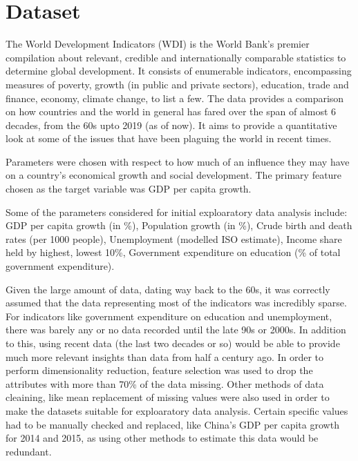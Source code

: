 \documentclass[conference]{IEEEtran}
\begin{document}
\section{Dataset}
The World Development Indicators (WDI) is the World Bank’s premier compilation 
about relevant, credible and internationally comparable statistics to determine 
global development. It consists of enumerable indicators, encompassing measures 
of poverty, growth (in public and private sectors), education, trade and finance, 
economy, climate change, to list a few. The data provides a comparison on how 
countries and the world in general has fared over the span of almost 6 decades, 
from the 60s upto 2019 (as of now). It aims to provide a quantitative look at 
some of the issues that have been plaguing the world in recent times.

Parameters were chosen with respect to how much of an influence they may have 
on a country's economical growth and social development. The primary feature chosen
as the target variable was GDP per capita growth.

Some of the parameters considered for initial exploaratory data analysis include: 
GDP per capita growth (in \%), 
Population growth (in \%), 
Crude birth and death rates (per 1000 people), 
Unemployment (modelled ISO estimate), 
Income share held by highest, lowest 10\%, 
Government expenditure on education (\% of total government expenditure).


Given the large amount of data, dating way back to the 60s, it was correctly assumed that the data representing most of the indicators was incredibly sparse. For indicators like government expenditure on education and unemployment, there was barely any or no data recorded until the late 90s or 2000s. In addition to this, using recent data (the last two decades or so) would be able to provide much more relevant insights than data from half a century ago. In order to perform dimensionality reduction, feature selection was used to drop the attributes with more than 
70\% of the data missing. Other methods of data cleaining, like mean replacement of missing values were also used in order to make the datasets suitable for exploaratory data analysis. Certain specific values had to be manually checked and replaced, like China's GDP per capita growth for 2014 and 2015, as using other methods to estimate this data would be redundant.

\end{document}
